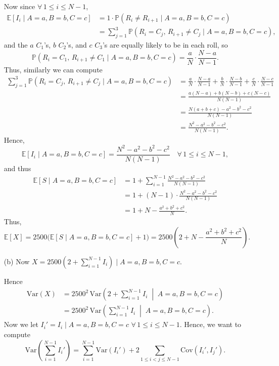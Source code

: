 \documentclass[a4paper,12pt]{article}
\begin{document}
\begin{itemize}
    Now since $\forall\, 1 \leq i \leq N-1$,
    \begin{align*}
        \mathbb{E}[I_i \mid A=a, B=b, C=c] &= 1 \cdot \mathbb{P}(R_i \neq R_{i+1} \mid A=a, B=b, C=c) \\
        &= \sum_{j=1}^{3} \mathbb{P}(R_i = C_j,\, R_{i+1} \neq C_j \mid A=a, B=b, C=c),
    \end{align*}
    and the $a$ $C_1$'s, $b$ $C_2$'s, and $c$ $C_3$'s are equally likely to be in each roll, so
    \[
        \mathbb{P}(R_i = C_1,\, R_{i+1} \neq C_1 \mid A=a, B=b, C=c) = \frac{a}{N} \cdot \frac{N-a}{N-1}.
    \]
    Thus, similarly we can compute
    \begin{align*}
        \sum_{j=1}^{3} \mathbb{P}(R_i = C_j,\, R_{i+1} \neq C_j \mid A=a, B=b, C=c)
        &= \frac{a}{N} \cdot \frac{N-a}{N-1} + \frac{b}{N} \cdot \frac{N-b}{N-1} + \frac{c}{N} \cdot \frac{N-c}{N-1} \\
        &= \frac{a(N-a)+b(N-b)+c(N-c)}{N(N-1)} \\
        &= \frac{N(a+b+c)-a^2-b^2-c^2}{N(N-1)} \\
        &= \frac{N^2-a^2-b^2-c^2}{N(N-1)}.
    \end{align*}
    Hence,
    \[
        \mathbb{E}[I_i \mid A=a, B=b, C=c] = \frac{N^2-a^2-b^2-c^2}{N(N-1)} \quad \forall\, 1 \leq i \leq N-1,
    \]
    and thus
    \begin{align*}
        \mathbb{E}[S \mid A=a, B=b, C=c] &= 1 + \sum_{i=1}^{N-1} \frac{N^2-a^2-b^2-c^2}{N(N-1)} \\
        &= 1 + (N-1)\cdot\frac{N^2-a^2-b^2-c^2}{N(N-1)} \\
        &= 1 + N - \frac{a^2+b^2+c^2}{N}.
    \end{align*}
    Thus,
    \[
        \mathbb{E}[X] = 2500\bigl(\mathbb{E}[S \mid A=a, B=b, C=c]+1\bigr) = 2500 \left(2 + N - \frac{a^2+b^2+c^2}{N}\right).
    \]

    \item[(b)] Now $X = 2500 \left(2 + \sum_{i=1}^{N-1} I_i\right) \mid A=a, B=b, C=c$.

    Hence
    \begin{align*}
        \mathrm{Var}(X)
        &= 2500^2\,\mathrm{Var} \left(2 + \sum_{i=1}^{N-1} I_i \;\middle|\; A=a, B=b, C=c\right) \\
        &= 2500^2\,\mathrm{Var} \left(\sum_{i=1}^{N-1} I_i \;\middle|\; A=a, B=b, C=c\right).
    \end{align*}
    Now we let $I_i' = I_i \mid A=a, B=b, C=c$ $\forall\, 1 \leq i \leq N-1$. Hence, we want to compute
    \[
        \mathrm{Var} \left(\sum_{i=1}^{N-1} I_i'\right) = \sum_{i=1}^{N-1} \mathrm{Var}(I_i') + 2\sum_{1 \leq i < j \leq N-1} \mathrm{Cov}(I_i', I_j').
    \]


\end{itemize}
\end{document}
